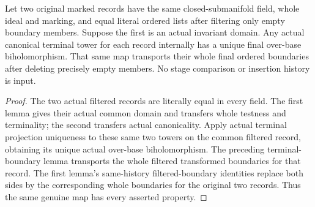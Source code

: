 \begin{theorem}
\label{hir:original-boundary-empty-filter-terminal-choice}
\leanok
Let two original marked records have the same closed-submanifold field,
whole ideal and marking, and equal literal ordered lists after filtering
only empty boundary members. Suppose the first is an actual invariant
domain. Any actual canonical terminal tower for each record internally
has a unique final over-base biholomorphism. That same map transports
their whole final ordered boundaries after deleting precisely empty
members. No stage comparison or insertion history is input.
\end{theorem}
\begin{proof}
The two actual filtered records are literally equal in every field.
The first lemma gives their actual common domain and transfers whole
testness and terminality; the second transfers actual canonicality.
Apply actual terminal projection uniqueness to these same two towers
on the common filtered record, obtaining its unique actual over-base
biholomorphism. The preceding terminal-boundary lemma transports the
whole filtered transformed boundaries for that record. The first lemma's
same-history filtered-boundary identities replace both sides by the
corresponding whole boundaries for the original two records. Thus the
same genuine map has every asserted property.
\end{proof}

